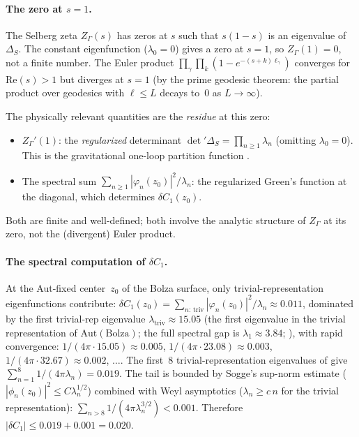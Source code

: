 \paragraph{The zero at $s = 1$.}
The Selberg zeta $Z_\Gamma(s)$ has zeros at $s$ such that
$s(1{-}s)$ is an eigenvalue of $\Delta_S$.
The constant eigenfunction ($\lambda_0 = 0$) gives a zero
at $s = 1$, so $Z_\Gamma(1) = 0$, not a finite number.
The Euler product
$\prod_\gamma \prod_k (1 - e^{-(s+k)\ell_\gamma})$
converges for $\mathrm{Re}(s) > 1$ but diverges at $s = 1$
(by the prime geodesic theorem: the partial product over
geodesics with $\ell \le L$ decays to~$0$ as $L \to \infty$).

The physically relevant quantities are the \emph{residue}
at this zero:
\begin{itemize}
  \item $Z_\Gamma'(1)$: the \emph{regularized} determinant
    $\det{}'\Delta_S = \prod_{n \ge 1} \lambda_n$ (omitting
    $\lambda_0 = 0$).
    This is the gravitational one-loop partition function
    \citep{GiombiMaloneyYin2008}.
  \item The spectral sum
    $\sum_{n \ge 1} |\varphi_n(z_0)|^2 / \lambda_n$:
    the regularized Green's function at the diagonal,
    which determines $\delta C_1(z_0)$.
\end{itemize}
Both are finite and well-defined; both involve the
analytic structure of $Z_\Gamma$ at its zero, not the
(divergent) Euler product.

\paragraph{The spectral computation of $\delta C_1$.}
\label{par:bolza-verification}
At the Aut-fixed center~$z_0$ of the Bolza surface,
only trivial-representation eigenfunctions contribute:
$\delta C_1(z_0) = \sum_{n:\,\text{triv}}
|\varphi_n(z_0)|^2 / \lambda_n \approx 0.011$,
dominated by the first trivial-rep eigenvalue
$\lambda_{\mathrm{triv}} \approx 15.05$
(the first eigenvalue in the trivial representation of
$\mathrm{Aut}(\mathrm{Bolza})$; the full spectral gap is
$\lambda_1 \approx 3.84$;
\citealt{Strohmaier2013}), with rapid convergence:
$1/(4\pi \cdot 15.05) \approx 0.005$,
$1/(4\pi \cdot 23.08) \approx 0.003$,
$1/(4\pi \cdot 32.67) \approx 0.002$, $\ldots$.
The first~$8$ trivial-representation eigenvalues of
\citet{Strohmaier2013} give
$\sum_{n=1}^{8} 1/(4\pi\lambda_n) = 0.019$.
The tail is bounded by Sogge's sup-norm estimate
($|\phi_n(z_0)|^2 \le C\lambda_n^{1/2}$)
combined with Weyl asymptotics ($\lambda_n \ge c\,n$
for the trivial representation):
$\sum_{n > 8} 1/(4\pi\lambda_n^{3/2}) < 0.001$.
Therefore
$|\delta C_1| \le 0.019 + 0.001 = 0.020$.

